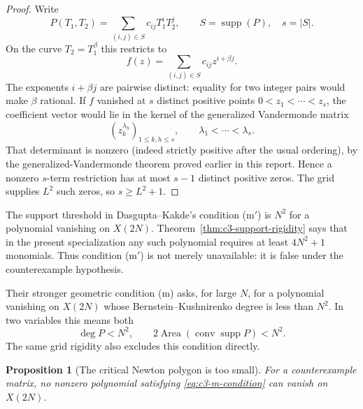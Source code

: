 \documentclass[11pt,oneside]{article}
\newtheorem{proposition}[theorem]{Proposition}
\theoremstyle{definition}
\theoremstyle{remark}
\newcommand{\supp}{\operatorname{supp}}
\begin{document}
\begin{proof}
Write
\[
 P(T_1,T_2)=\sum_{(i,j)\in S}c_{ij}T_1^iT_2^j,
 \qquad S=\supp(P),\quad s=|S|.
\]
On the curve $T_2=T_1^\beta$ this restricts to
\[
 f(z)=\sum_{(i,j)\in S}c_{ij}z^{i+\beta j}.
\]
The exponents $i+\beta j$ are pairwise distinct: equality for two integer pairs would make
$\beta$ rational.  If $f$ vanished at $s$ distinct positive points
$0<z_1<\cdots<z_s$, the coefficient vector would lie in the kernel of the generalized
Vandermonde matrix
\[
  (z_k^{\lambda_h})_{1\le k,h\le s},
  \qquad \lambda_1<\cdots<\lambda_s.
\]
That determinant is nonzero (indeed strictly positive after the usual ordering), by the
generalized-Vandermonde theorem proved earlier in this report.  Hence a nonzero $s$-term
restriction has at most $s-1$ distinct positive zeros.  The grid supplies $L^2$ such zeros,
so $s\ge L^2+1$.
\end{proof}

The support threshold in Dasgupta--Kakde's condition (m$'$) is $N^2$ for a polynomial
vanishing on $X(2N)$.  Theorem~\ref{thm:c3-support-rigidity} says that in the present
specialization any such polynomial requires at least $4N^2+1$ monomials.  Thus condition
(m$'$) is not merely unavailable: it is false under the counterexample hypothesis.

Their stronger geometric condition (m) asks, for large $N$, for a polynomial vanishing on
$X(2N)$ whose Bernstein--Kushnirenko degree is less than $N^2$.  In two variables this means
both
\begin{equation}\label{eq:c3-m-condition}
 \deg P<N^2,
 \qquad
 2\operatorname{Area}(\operatorname{conv}\supp P)<N^2.
\end{equation}
The same grid rigidity also excludes this condition directly.

\begin{proposition}[The critical Newton polygon is too small]
\label{prop:c3-m-fails}
For a counterexample matrix, no nonzero polynomial satisfying \eqref{eq:c3-m-condition} can
vanish on $X(2N)$.
\end{proposition}
\end{document}
